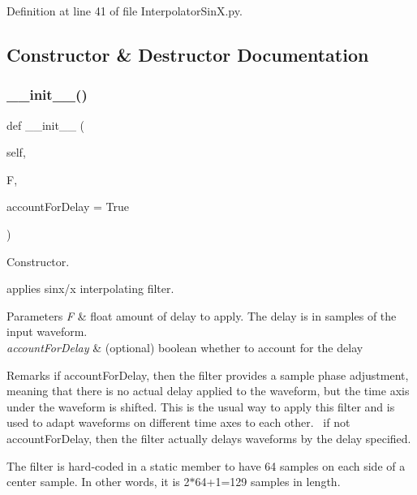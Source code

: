 Definition at line 41 of file Interpolator\+Sin\+X.\+py.



\subsection{Constructor \& Destructor Documentation}
\mbox{\label{classSignalIntegrity_1_1TimeDomain_1_1Filters_1_1InterpolatorSinX_1_1FractionalDelayFilterSinX_a71162faa904c7ea2018b89ebba16c33d}} 
\subsubsection{\texorpdfstring{\+\_\+\+\_\+init\+\_\+\+\_\+()}{\_\_init\_\_()}}
{\footnotesize\ttfamily def \+\_\+\+\_\+init\+\_\+\+\_\+ (\begin{DoxyParamCaption}\item[{}]{self,  }\item[{}]{F,  }\item[{}]{account\+For\+Delay = {\ttfamily True} }\end{DoxyParamCaption})}



Constructor. 

applies sinx/x interpolating filter.


\begin{DoxyParams}{Parameters}
{\em F} & float amount of delay to apply. The delay is in samples of the input waveform. \\
\hline
{\em account\+For\+Delay} & (optional) boolean whether to account for the delay \\
\hline
\end{DoxyParams}
\begin{DoxyRemark}{Remarks}
if account\+For\+Delay, then the filter provides a sample phase adjustment, meaning that there is no actual delay applied to the waveform, but the time axis under the waveform is shifted. This is the usual way to apply this filter and is used to adapt waveforms on different time axes to each other.~\newline
 if not account\+For\+Delay, then the filter actually delays waveforms by the delay specified. 

The filter is hard-\/coded in a static member to have 64 samples on each side of a center sample. In other words, it is 2$\ast$64+1=129 samples in length. 
\end{DoxyRemark}


